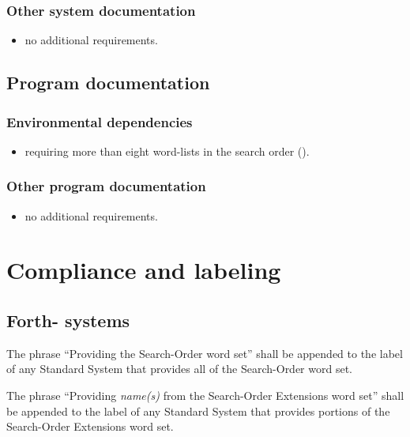 \subsubsection{Other system documentation} %

\begin{itemize}
\item no additional requirements.
\end{itemize}

\subsection{Program documentation} %

\subsubsection{Environmental dependencies} %

\begin{itemize}
\item requiring more than eight word-lists in the search order
	().
\end{itemize}

\subsubsection{Other program documentation} %

\begin{itemize}
\item no additional requirements.
\end{itemize}


\section{Compliance and labeling} %

\subsection{Forth-\snapshot{} systems} %

The phrase ``Providing the Search-Order word set'' shall be
appended to the label of any Standard System that provides all of
the Search-Order word set.

The phrase ``Providing \emph{name(s)} from the Search-Order
Extensions word set'' shall be appended to the label of any
Standard System that provides portions of the Search-Order
Extensions word set.

